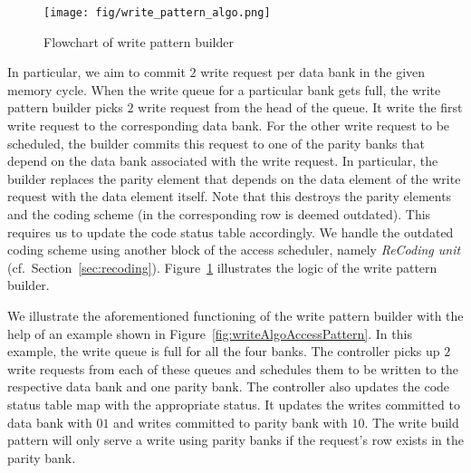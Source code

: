 \begin{figure}[htbp]
\centering
	\texttt{[image: fig/write\_pattern\_algo.png]}
	\caption{{ Flowchart of write pattern builder}}
	\label{fig:writeFlow}
\end{figure}

In particular, we aim to commit $2$ write request per data bank in the given memory cycle. When the write queue for a particular bank gets full, the write pattern builder picks $2$ write request from the head of the queue. It write the first write request to the corresponding data bank. For the other write request to be scheduled, the builder commits this request to one of the parity banks that depend on the data bank associated with the write request. {\color{blue}In particular, the builder replaces the parity element that depends on the data element of the write request with the data element itself. Note that this destroys the parity elements and the coding scheme (in the corresponding row is deemed outdated).} This requires us to update the code status table accordingly. We handle the outdated coding scheme using another block of the access scheduler, namely {\em ReCoding unit} (cf.~Section~\ref{sec:recoding}). Figure~\ref{fig:writeFlow} illustrates the logic of the write pattern builder.


We illustrate the aforementioned functioning of the write pattern builder with the help of an example shown in Figure~\ref{fig:writeAlgoAccessPattern}. In this example, the write queue is full for all the four banks. The controller picks up $2$ write requests from each of these queues and schedules them to be written to the respective data bank and one parity bank. The controller also updates the code status table map with the appropriate status. It updates the writes committed to data bank with $01$ and writes committed to parity bank with $10$. The write build pattern will only serve a write using parity banks if the request's row exists in the parity bank. 

